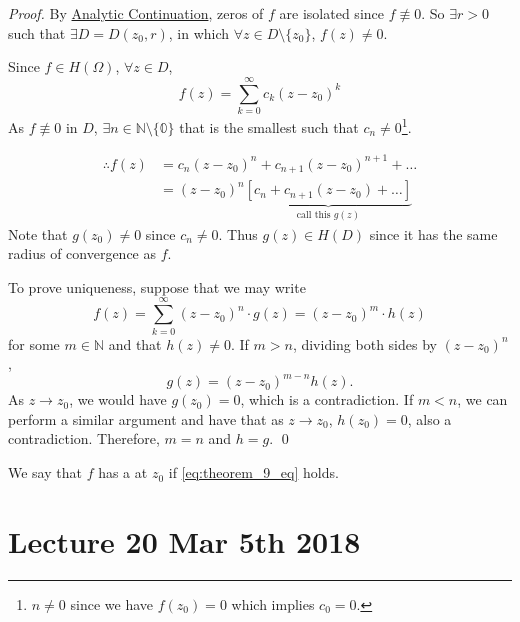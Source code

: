 \documentclass[11pt, oneside]{book}
\begin{document}
\begin{proof}
	By \hyperref[lemma:principle_of_analytic_continuation]{Analytic Continuation}, zeros of $f$ are isolated since $f \not\equiv 0$. So $\exists r > 0$ such that $\exists D = D(z_0, r)$, in which $\forall z \in D \setminus \{z_0\}$, $f(z) \neq 0$.

	Since $f \in H(\Omega)$, $\forall z \in D$,
	\begin{equation*}
		f(z) = \sum_{k=0}^{\infty} c_k (z - z_0)^k
	\end{equation*}
	As $f \not\equiv 0$ in $D$, $\exists n \in \mathbb{N \setminus \{0\}}$ that is the smallest such that $c_n \neq 0$\footnote{$n \neq 0$ since we have $f(z_0) = 0$ which implies $c_0 = 0$.}.

	\begin{align*}
		\therefore f(z)
			&= c_n(z - z_0)^n + c_{n + 1} (z - z_0)^{n + 1} + \hdots \\
			&= (z - z_0)^n \underbrace{\left[ c_n + c_{n + 1} (z - z_0) + \hdots \right]}_{\text{call this } g(z)}
	\end{align*}
	Note that $g(z_0) \neq 0$ since $c_n \neq 0$. Thus $g(z) \in H(D)$ since it has the same radius of convergence as $f$.

	To prove uniqueness, suppose that we may write
	\begin{equation*}
		f(z) = \sum_{k=0}^{\infty} (z - z_0)^n \cdot g(z) = (z - z_0)^m \cdot h(z)
	\end{equation*}
	for some $m \in \mathbb{N}$ and that $h(z) \neq 0$. If $m > n$, dividing both sides by $(z - z_0)^n$,
	\begin{equation*}
		g(z) = (z - z_0)^{m - n} h(z).
	\end{equation*}
	As $z \to z_0$, we would have $g(z_0) = 0$, which is a contradiction. If $m < n$, we can perform a similar argument and have that as $z \to z_0$, $h(z_0) = 0$, also a contradiction. Therefore, $m = n$ and $h = g$. \qed
\end{proof}

We say that $f$ has a  at $z_0$ if \cref{eq:theorem_9_eq} holds.



\chapter{Lecture 20 Mar 5th 2018}
	\label{chapter:lecture_20_mar_5th_2018}
\end{document}
